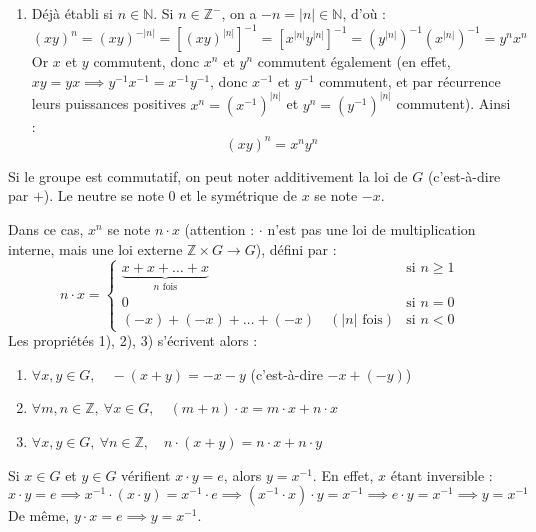 \documentclass[a4paper,11pt]{article}
\newcommand{\N}{\mathbb{N}}
\newcommand{\Z}{\mathbb{Z}}
\begin{document}
\begin{demonstration}
\begin{enumerate}
    \item Déjà établi si $n \in \N$.
    Si $n \in \Z^-$, on a $-n = |n| \in \N$, d'où :
    \[
    (xy)^n = (xy)^{-|n|} = \left[ (xy)^{|n|} \right]^{-1} = \left[ x^{|n|} y^{|n|} \right]^{-1} = (y^{|n|})^{-1} (x^{|n|})^{-1} = y^n x^n
    \]
    Or $x$ et $y$ commutent, donc $x^n$ et $y^n$ commutent également (en effet, $xy = yx \implies y^{-1} x^{-1} = x^{-1} y^{-1}$, donc $x^{-1}$ et $y^{-1}$ commutent, et par récurrence leurs puissances positives $x^n = (x^{-1})^{|n|}$ et $y^n = (y^{-1})^{|n|}$ commutent). Ainsi :
    \[
    (xy)^n = x^n y^n
    \]
\end{enumerate}
\end{demonstration}

\begin{remarque}
Si le groupe est commutatif, on peut noter additivement la loi de $G$ (c'est-à-dire par $+$). Le neutre se note $0$ et le symétrique de $x$ se note $-x$.

Dans ce cas, $x^n$ se note $n \cdot x$ (attention : $\cdot$ n'est pas une loi de multiplication interne, mais une loi externe $\Z \times G \to G$), défini par :
\[
n \cdot x = \begin{cases}
\underbrace{x + x + \dots + x}_{n \text{ fois}} & \text{si } n \ge 1 \\[1.2em]
0 & \text{si } n = 0 \\[0.4em]
(-x) + (-x) + \dots + (-x) \quad (|n| \text{ fois}) & \text{si } n < 0
\end{cases}
\]
Les propriétés 1), 2), 3) s'écrivent alors :
\begin{enumerate}
    \item $\forall x, y \in G, \quad -(x + y) = -x - y$ \quad (c'est-à-dire $-x + (-y)$)
    \item $\forall m, n \in \Z, \ \forall x \in G, \quad (m + n) \cdot x = m \cdot x + n \cdot x$
    \item $\forall x, y \in G, \ \forall n \in \Z, \quad n \cdot (x + y) = n \cdot x + n \cdot y$
\end{enumerate}
\end{remarque}

\begin{remarque}
Si $x \in G$ et $y \in G$ vérifient $x \cdot y = e$, alors $y = x^{-1}$.
En effet, $x$ étant inversible :
\[
x \cdot y = e \implies x^{-1} \cdot (x \cdot y) = x^{-1} \cdot e \implies (x^{-1} \cdot x) \cdot y = x^{-1} \implies e \cdot y = x^{-1} \implies y = x^{-1}
\]
De même, $y \cdot x = e \implies y = x^{-1}$.
\end{remarque}
\end{document}
